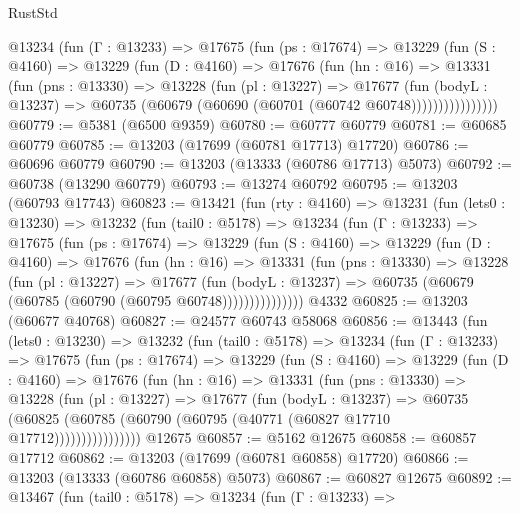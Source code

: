 \begin{lexlean}{RustStd}
\begin{coremodule}
          @13234
            (fun (Γ : @13233) =>
            @17675
              (fun (ps : @17674) =>
              @13229
                (fun (S : @4160) =>
                @13229
                  (fun (D : @4160) =>
                  @17676
                    (fun (hn : @16) =>
                    @13331
                      (fun (pns : @13330) =>
                      @13228
                        (fun (pl : @13227) =>
                        @17677
                          (fun (bodyL : @13237) =>
                          @60735 (@60679 (@60690 (@60701 (@60742 @60748))))))))))))))))
@60779 := @5381 (@6500 @9359)
@60780 := @60777 @60779
@60781 := @60685 @60779
@60785 := @13203 (@17699 (@60781 @17713) @17720)
@60786 := @60696 @60779
@60790 := @13203 (@13333 (@60786 @17713) @5073)
@60792 := @60738 (@13290 @60779)
@60793 := @13274 @60792
@60795 := @13203 (@60793 @17743)
@60823 := @13421
    (fun (rty : @4160) =>
    @13231
      (fun (lets0 : @13230) =>
      @13232
        (fun (tail0 : @5178) =>
        @13234
          (fun (Γ : @13233) =>
          @17675
            (fun (ps : @17674) =>
            @13229
              (fun (S : @4160) =>
              @13229
                (fun (D : @4160) =>
                @17676
                  (fun (hn : @16) =>
                  @13331
                    (fun (pns : @13330) =>
                    @13228
                      (fun (pl : @13227) =>
                      @17677
                        (fun (bodyL : @13237) =>
                        @60735 (@60679 (@60785 (@60790 (@60795 @60748)))))))))))))))
    @4332
@60825 := @13203 (@60677 @40768)
@60827 := @24577 @60743 @58068
@60856 := @13443
    (fun (lets0 : @13230) =>
    @13232
      (fun (tail0 : @5178) =>
      @13234
        (fun (Γ : @13233) =>
        @17675
          (fun (ps : @17674) =>
          @13229
            (fun (S : @4160) =>
            @13229
              (fun (D : @4160) =>
              @17676
                (fun (hn : @16) =>
                @13331
                  (fun (pns : @13330) =>
                  @13228
                    (fun (pl : @13227) =>
                    @17677
                      (fun (bodyL : @13237) =>
                      @60735
                        (@60825
                          (@60785 (@60790 (@60795 (@40771 (@60827 @17710 @17712))))))))))))))))
    @12675
@60857 := @5162 @12675
@60858 := @60857 @17712
@60862 := @13203 (@17699 (@60781 @60858) @17720)
@60866 := @13203 (@13333 (@60786 @60858) @5073)
@60867 := @60827 @12675
@60892 := @13467
    (fun (tail0 : @5178) =>
    @13234
      (fun (Γ : @13233) =>

\end{coremodule}
\end{lexlean}
